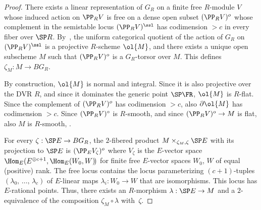 \begin{proof}
There exists a linear representation of $G_R$ on a finite free $R$-module $V$ whose induced action on $\PP_R V$ is free on a dense open subset $(\PP_R V)^o$ whose complement in the semistable locus $(\PP_R V)^{\ssl}$ has codimension $>c$ in every fiber over $\SP R$. By~\cite{Sesh}, the uniform categorical quotient of the action of $G_R$ on $(\PP_R V)^{\ssl}$ is a projective $R$-scheme $\ol{M}$, and there exists a unique open subscheme $M$ such that $(\PP_R V)^o$ is a $G_R$-torsor over $M$. This defines $\zeta_M:M\to BG_R$.

By construction, $\ol{M}$ is normal and integral. Since it is also projective over the DVR $R$, and since it dominates the generic point $\SP \FR$, $\ol{M}$ is $R$-flat. Since the complement of $(\PP_R V)^o$ has codimension $>c$, also $\partial \ol{M}$ has codimension $>c$. Since $(\PP_R V)^\circ$ is $R$-smooth, and since $(\PP_R V)^o\to M$ is flat, also $M$ is $R$-smooth, \cite[Proposition~17.7.7]{EGA4}.

For every $\zeta:\SP E \to BG_R$, the $2$-fibered product $M\times_{\zeta_M,\zeta} \SP E$ with its projection to $\SP E$ is $(\PP_E V_\zeta)^o$ where $V_\zeta$ is the $E$-vector space $\Hom_E(E^{\oplus c+1},\Hom_E(W_0,W)\! )$ for finite free $E$-vector spaces $W_0$, $W$ of equal (positive) rank. The free locus contains the locus parameterizing $(c+1)$-tuples $(\lambda_0,\,\dots,\,\lambda_c)$ of $E$-linear maps $\lambda_i:W_0\to W$ that are isomorphisms. This locus has $E$-rational points. Thus, there exists an $R$-morphism $\lambda:\SP E \to M$ and a $2$-equivalence of the composition $\zeta_M\circ \lambda$ with~$\zeta$.
\end{proof}

